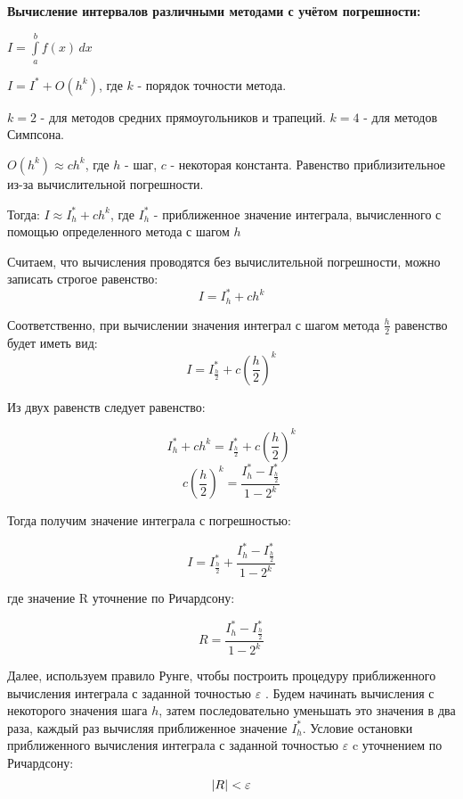 \documentclass [12pt]{article}
\DeclarePairedDelimiter{\abs}{\lvert}{\rvert}
\begin{document}
\textbf{Вычисление интервалов различными методами с учётом погрешности:}

$I = \int\limits_a^b f(x)\,dx $

$I = I^{*} + O(h^k)$, где $k$ - порядок точности метода.

$k = 2$ - для методов средних прямоугольников и трапеций.
$k = 4$ - для методов Симпсона.

$O(h^k) \approx ch^k$, где $h$ - шаг, $c$ - некоторая константа. Равенство приблизительное из-за вычислительной погрешности.

Тогда:
$I \approx I^{*}_{h} + ch^k$, где $I^{*}_{h}$ - приближенное значение интеграла, вычисленного с помощью определенного метода с шагом $h$

Считаем, что вычисления проводятся без вычислительной погрешности, можно записать строгое равенство:
$$I = I^{*}_{h} + ch^k$$

Соответственно, при вычислении значения интеграл с шагом метода $\frac{h}{2}$ равенство будет иметь вид:
$$I = I^{*}_{\frac{h}{2}} + c(\frac{h}{2})^k$$

Из двух равенств следует равенство:

$$I^{*}_{h} + ch^k = I^{*}_{\frac{h}{2}} + c(\frac{h}{2})^k$$
$$c(\frac{h}{2})^k = \frac{I^{*}_{h} - I^{*}_{\frac{h}{2}}}{1-2^k}$$

Тогда получим значение интеграла с погрешностью:

$$I = I^{*}_{\frac{h}{2}} + \frac{I^{*}_{h} - I^{*}_{\frac{h}{2}}}{1-2^k}$$

где значение R уточнение по Ричардсону:

$$R =  \frac{I^{*}_{h} - I^{*}_{\frac{h}{2}}}{1-2^k}$$ 

Далее, используем правило Рунге, чтобы построить процедуру приближенного вычисления интеграла с заданной точностью $\varepsilon$ . Будем начинать вычисления с некоторого значения шага $h$, затем последовательно уменьшать это значения в два раза, каждый раз вычисляя приближенное значение $I^{*}_{h}$. Условие остановки приближенного вычисления интеграла с заданной точностью $\varepsilon$ c уточнением по Ричардсону: $$\abs{R}<\varepsilon$$
\end{document}
